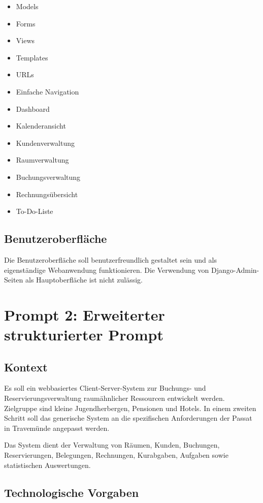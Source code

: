 \begin{itemize}
\item Models
\item Forms
\item Views
\item Templates
\item URLs
\item Einfache Navigation
\item Dashboard
\item Kalenderansicht
\item Kundenverwaltung
\item Raumverwaltung
\item Buchungsverwaltung
\item Rechnungsübersicht
\item To-Do-Liste
\end{itemize}

\subsection{Benutzeroberfläche}

Die Benutzeroberfläche soll benutzerfreundlich gestaltet sein und als eigenständige Webanwendung funktionieren. Die Verwendung von Django-Admin-Seiten als Hauptoberfläche ist nicht zulässig.


\newpage
\section{Prompt 2: Erweiterter strukturierter Prompt}

\subsection{Kontext}

Es soll ein webbasiertes Client-Server-System zur Buchungs- und Reservierungsverwaltung raumähnlicher Ressourcen entwickelt werden. Zielgruppe sind kleine Jugendherbergen, Pensionen und Hotels. In einem zweiten Schritt soll das generische System an die spezifischen Anforderungen der Passat in Travemünde angepasst werden.

Das System dient der Verwaltung von Räumen, Kunden, Buchungen, Reservierungen, Belegungen, Rechnungen, Kurabgaben, Aufgaben sowie statistischen Auswertungen.

\subsection{Technologische Vorgaben}

